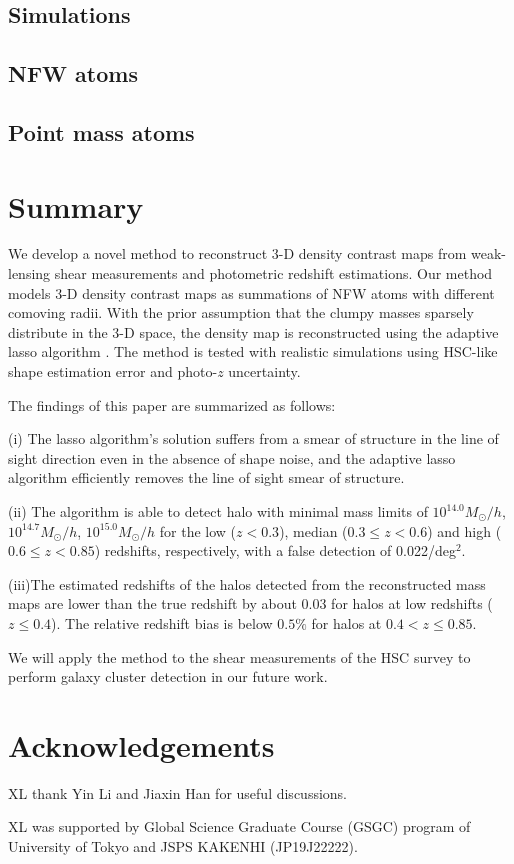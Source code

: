 \documentclass[twocolumn]{aastex62}
\begin{document}
\subsection{Simulations}
\label{subsec_Sims}


\subsection{NFW atoms}
\label{subsec_test-nfw}


\subsection{Point mass atoms}
\label{subsec_test-pm}




\section{Summary}
\label{sec_Sum}

We develop a novel method to reconstruct $3$-D density contrast maps from
weak-lensing shear measurements and photometric redshift estimations.  Our
method models $3$-D density contrast maps as summations of NFW atoms with
different comoving radii.  With the prior assumption that the clumpy masses
sparsely distribute in the $3$-D space, the density map is reconstructed
using the adaptive lasso algorithm \citep{AdaLASSO-Zou2006}. The method is
tested with realistic simulations using HSC-like shape estimation error and
photo-$z$ uncertainty.

The findings of this paper are summarized as follows:

(i) The lasso algorithm's solution suffers from a smear of structure in the
line of sight direction even in the absence of shape noise, and the adaptive
lasso algorithm efficiently removes the line of sight smear of structure.

(ii) The algorithm is able to detect halo with minimal mass limits of
$10^{14.0} M_{\odot}/h$, $10^{14.7} M_{\odot}/h$, $10^{15.0} M_{\odot}/h$ for
the low ($z<0.3$), median ($0.3\leq z< 0.6$) and high ($0.6\leq z< 0.85$)
redshifts, respectively, with a false detection of 0.022/deg$^2$.

(iii)The estimated redshifts of the halos detected from the reconstructed mass
maps are lower than the true redshift by about $0.03$ for halos at low
redshifts ($z\leq 0.4$).  The relative redshift bias is below $0.5\%$ for halos
at $0.4<z\leq 0.85$.

We will apply the method to the shear measurements of the HSC survey
\citep{HSC1-catalog,FPFSHSC1-Li2020} to perform galaxy cluster detection in our
future work.

\section*{Acknowledgements}
XL thank Yin Li and Jiaxin Han for useful discussions.

XL was supported by Global Science Graduate Course (GSGC) program of
University of Tokyo and JSPS KAKENHI (JP19J22222).


\end{document}
